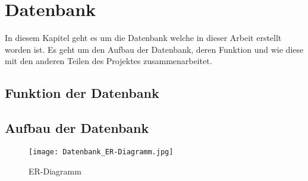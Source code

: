 \renewcommand{\theauthor}{Matthias Franz}
\section{Datenbank}
\label{sec:datenbank}
In diesem Kapitel geht es um die Datenbank welche in dieser Arbeit erstellt worden ist. Es geht um den Aufbau der Datenbank, deren Funktion und wie diese mit den anderen Teilen des Projektes zusammenarbeitet.

\subsection{Funktion der Datenbank}
\label{sec:funktionDatenbank}

\subsection{Aufbau der Datenbank}
\label{sec:aufbauDatenbank}

\pagebreak
\begin{figure}[H]
	\texttt{[image: Datenbank\_ER-Diagramm.jpg]}
    \caption{ER-Diagramm}
    \label{fig:sprintBacklog}
\end{figure}
	
\pagebreak